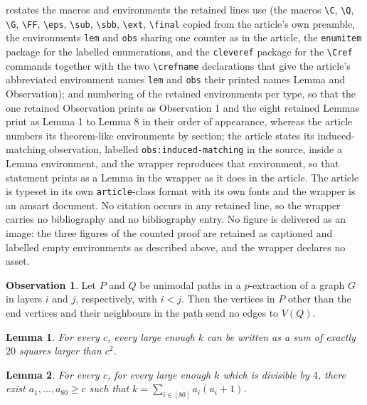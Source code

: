 \documentclass[10pt,a4paper]{amsart}
\theoremstyle{plain}
\newtheorem{lem}{Lemma}
\theoremstyle{definition}
\newtheorem{obs}{Observation}
\begin{document}
restates the macros and environments the retained lines use (the macros \texttt{\textbackslash C}, \texttt{\textbackslash Q}, \texttt{\textbackslash G}, \texttt{\textbackslash FF}, \texttt{\textbackslash eps}, \texttt{\textbackslash sub}, \texttt{\textbackslash sbb}, \texttt{\textbackslash ext}, \texttt{\textbackslash final} copied from the article's own preamble, the environments \texttt{lem} and \texttt{obs} sharing one counter as in the article, the \texttt{enumitem} package for the labelled enumerations, and the \texttt{cleveref} package for the \texttt{\textbackslash Cref} commands together with the two \texttt{\textbackslash crefname} declarations that give the article's abbreviated environment names \texttt{lem} and \texttt{obs} their printed names Lemma and Observation); and numbering of the retained environments per type, so that the one retained Observation prints as Observation 1 and the eight retained Lemmas print as Lemma 1 to Lemma 8 in their order of appearance, whereas the article numbers its theorem-like environments by section; the article states its induced-matching observation, labelled \texttt{obs:induced-matching} in the source, inside a Lemma environment, and the wrapper reproduces that environment, so that statement prints as a Lemma in the wrapper as it does in the article. The article is typeset in its own \texttt{article}-class format with its own fonts and the wrapper is an amsart document. No citation occurs in any retained line, so the wrapper carries no bibliography and no bibliography entry. No figure is delivered as an image: the three figures of the counted proof are retained as captioned and labelled empty environments as described above, and the wrapper declares no asset.
    \begin{obs} \label{obs:unimodal}
        Let $P$ and $Q$ be unimodal paths in a $p$-extraction of a graph $G$ in layers $i$ and $j$, respectively, with $i < j$.
        Then the vertices in $P$ other than the end vertices and their neighbours in the path send no edges to $V(Q)$.
    \end{obs}

	\begin{lem} \label{lem:twenty-squares}
		For every $c$, every large enough $k$ can be written as a sum of exactly $20$ squares larger than $c^2$.
	\end{lem}

	\begin{lem} \label{lem:sum-skewed-squares}
		For every $c$, for every large enough $k$ which is divisible by $4$, there exist $a_1, \ldots, a_{80} \ge c$ such that $k = \sum_{i \in [80]} a_i(a_i + 1)$. 
	\end{lem}
\end{document}
